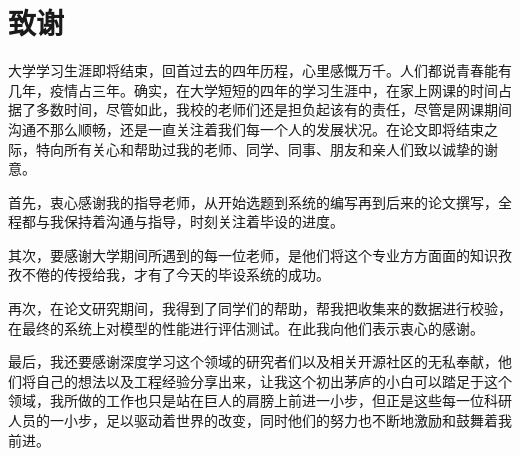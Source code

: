 \section*{致\hspace{.5\ccwd}谢}

大学学习生涯即将结束，回首过去的四年历程，心里感慨万千。人们都说青春能有几年，疫情占三年。确实，在大学短短的四年的学习生涯中，在家上网课的时间占据了多数时间，尽管如此，我校的老师们还是担负起该有的责任，尽管是网课期间沟通不那么顺畅，还是一直关注着我们每一个人的发展状况。在论文即将结束之际，特向所有关心和帮助过我的老师、同学、同事、朋友和亲人们致以诚挚的谢意。

首先，衷心感谢我的指导老师，从开始选题到系统的编写再到后来的论文撰写，全程都与我保持着沟通与指导，时刻关注着毕设的进度。

其次，要感谢大学期间所遇到的每一位老师，是他们将这个专业方方面面的知识孜孜不倦的传授给我，才有了今天的毕设系统的成功。

再次，在论文研究期间，我得到了同学们的帮助，帮我把收集来的数据进行校验，在最终的系统上对模型的性能进行评估测试。在此我向他们表示衷心的感谢。

最后，我还要感谢深度学习这个领域的研究者们以及相关开源社区的无私奉献，他们将自己的想法以及工程经验分享出来，让我这个初出茅庐的小白可以踏足于这个领域，我所做的工作也只是站在巨人的肩膀上前进一小步，但正是这些每一位科研人员的一小步，足以驱动着世界的改变，同时他们的努力也不断地激励和鼓舞着我前进。
